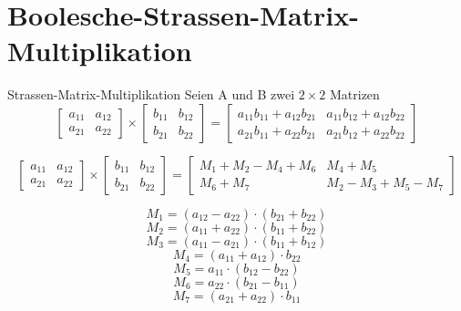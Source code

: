 \documentclass{beamer}
\begin{document}
	
	
	
	
	\section{Boolesche-Strassen-Matrix-Multiplikation}

	\begin{frame}{Strassen-Matrix-Multiplikation}
		Seien A und B zwei $2 \times 2$ Matrizen 
		$$
		\begin{bmatrix}
			a_{11} & a_{12}\\
			a_{21} & a_{22} 
		\end{bmatrix}
		\times
		\begin{bmatrix}
			b_{11} & b_{12}\\
			b_{21} & b_{22}
		\end{bmatrix}
		=
		\begin{bmatrix}
			a_{11} b_{11}  + a_{12} b_{21} & a_{11} b_{12} + a_{12} b_{22}\\
			a_{21} b_{11} + a_{22} b_{21} & a_{21} b_{12} + a_{22} b_{22}
		\end{bmatrix}
		$$
		
		$$
		\begin{bmatrix}
			a_{11} & a_{12}\\
			a_{21} & a_{22} 
		\end{bmatrix}
		\times
		\begin{bmatrix}
			b_{11} & b_{12}\\
			b_{21} & b_{22}
		\end{bmatrix}
		=
		\begin{bmatrix}
			M_{1} + M_{2} - M_{4} + M_{6} & M_{4} + M_{5}\\
			M_{6} + M_{7} & M_{2} - M_{3} + M_{5} - M_{7}
		\end{bmatrix}
		$$
		
		$$ M_{1} = (a_{12} - a_{22}) \cdot (b_{21} + b_{22}) $$
		$$M_{2} = (a_{11} + a_{22}) \cdot (b_{11} + b_{22}) $$
		$$M_{3} = (a_{11} - a_{21}) \cdot (b_{11} + b_{12})$$
		$$M_{4} = (a_{11} + a_{12}) \cdot b_{22}$$
		$$M_{5} = a_{11} \cdot (b_{12} - b_{22})$$
		$$M_{6} = a_{22} \cdot (b_{21} - b_{11})$$
		$$M_{7} = (a_{21} + a_{22}) \cdot b_{11}$$
	\end{frame}
\end{document}
